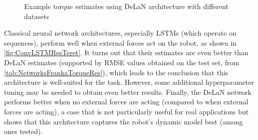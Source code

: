 \begin{figure}
    \centering
    \hfill
    \caption{Example torque estimates using DeLaN architecture with different datasets}
    \label{fig:DeLaNRes}
\end{figure}

Classical neural network architectures, especially LSTMs (which operate on sequences), perform well when external forces act on the robot, as shown in \cref{fig:ConvLSTMResTeret}. It turns out that their estimates are even better than DeLaN estimates (supported by RMSE values obtained on the test set, from \cref{tab:NetworksFrankaTorqueRes}), which leads to the conclusion that this architecture is well-suited for the task. However, some additional hyperparameter tuning may be needed to obtain even better results. Finally, the DeLaN network performs better when no external forces are acting (compared to when external forces are acting), a case that is not particularly useful for real applications but shows that this architecture captures the robot's dynamic model best (among ones tested).

